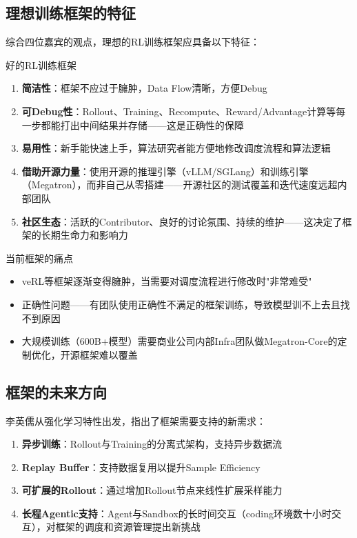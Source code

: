 \documentclass[a4paper]{article}
\begin{document}
\subsection{理想训练框架的特征}

综合四位嘉宾的观点，理想的RL训练框架应具备以下特征：

\begin{importantbox}{好的RL训练框架}
\begin{enumerate}
    \item \textbf{简洁性}：框架不应过于臃肿，Data Flow清晰，方便Debug
    \item \textbf{可Debug性}：Rollout、Training、Recompute、Reward/Advantage计算等每一步都能打出中间结果并存储——这是正确性的保障
    \item \textbf{易用性}：新手能快速上手，算法研究者能方便地修改调度流程和算法逻辑
    \item \textbf{借助开源力量}：使用开源的推理引擎（vLLM/SGLang）和训练引擎（Megatron），而非自己从零搭建——开源社区的测试覆盖和迭代速度远超内部团队
    \item \textbf{社区生态}：活跃的Contributor、良好的讨论氛围、持续的维护——这决定了框架的长期生命力和影响力
\end{enumerate}
\end{importantbox}

\begin{warningbox}{当前框架的痛点}
\begin{itemize}
    \item veRL等框架逐渐变得臃肿，当需要对调度流程进行修改时"非常难受"
    \item 正确性问题——有团队使用正确性不满足的框架训练，导致模型训不上去且找不到原因
    \item 大规模训练（600B+模型）需要商业公司内部Infra团队做Megatron-Core的定制优化，开源框架难以覆盖
\end{itemize}
\end{warningbox}

\subsection{框架的未来方向}

李英儒从强化学习特性出发，指出了框架需要支持的新需求：

\begin{enumerate}
    \item \textbf{异步训练}：Rollout与Training的分离式架构，支持异步数据流
    \item \textbf{Replay Buffer}：支持数据复用以提升Sample Efficiency
    \item \textbf{可扩展的Rollout}：通过增加Rollout节点来线性扩展采样能力
    \item \textbf{长程Agentic支持}：Agent与Sandbox的长时间交互（coding环境数十小时交互），对框架的调度和资源管理提出新挑战
\end{enumerate}
\end{document}
